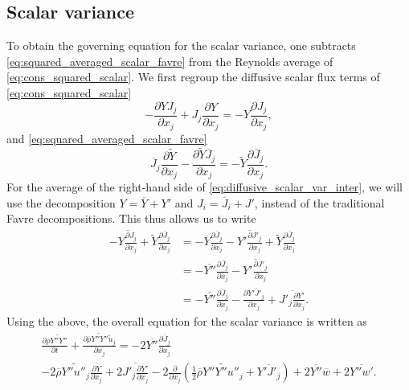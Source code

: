 \documentclass[oneside,a4paper,11pt]{report}
\newcommand{\rhoavg}{\overline{\rho}}
\newcommand{\wavg}{\overline{w}}
\newcommand{\Javg}{\overline{J}}
\newcommand{\Yavg}{\overline{Y}}
\newcommand{\wfluc}{w'}
\newcommand{\Jfluc}{J'}
\newcommand{\Yfluc}{Y'}
\newcommand{\uavgf}{\widetilde{u}}
\newcommand{\Yavgf}{\widetilde{Y}}
\newcommand{\Yflucf}{Y''}
\newcommand{\uflucf}{u''}
\begin{document}
\subsection{Scalar variance}
To obtain the governing equation for the scalar variance, one subtracts \cref{eq:squared_averaged_scalar_favre} from the Reynolds average of \cref{eq:cons_squared_scalar}. We first regroup the diffusive scalar flux terms of \cref{eq:cons_squared_scalar}
\begin{equation}
    \label{eq:diffusive_scalar_var_inter}
    -\frac{\partial Y J_j}{\partial x_j} + J_j \frac{\partial Y}{\partial x_j} = -Y \frac{\partial J_j}{\partial x_j},
\end{equation}
and \cref{eq:squared_averaged_scalar_favre}
\begin{equation}
    \Javg_j \frac{\partial \Yavgf}{\partial x_j} - \frac{\partial \Yavgf \Javg_j}{\partial x_j} = -\Yavgf \frac{\partial \Javg_j}{\partial x_j}.
\end{equation}
For the average of the right-hand side of \cref{eq:diffusive_scalar_var_inter}, we will use the decomposition $Y = \Yavg + \Yfluc$ and $J_i = \Javg_i + \Jfluc$, instead of the traditional Favre decompositions. This thus allows us to write
\begin{align}
    -\overline{ Y \frac{\partial J_j}{\partial x_j} } + \Yavgf \frac{\partial \Javg_j }{\partial x_j} &= -\Yavg \frac{\partial \Javg_j }{\partial x_j} - \overline{ \Yfluc \frac{\partial \Jfluc_j}{\partial x_j} } + \Yavgf \frac{\partial \Javg_j}{\partial x_j} \nonumber \\
    &= -\overline{ \Yflucf } \frac{\partial \Javg_j}{\partial x_j} - \overline{ \Yfluc \frac{\partial \Jfluc_j}{\partial x_j} } \nonumber \\
    &= -\overline{ \Yflucf } \frac{\partial \Javg_j }{\partial x_j} - \frac{\partial \overline{ \Yfluc \Jfluc_j } }{\partial x_j} + \overline{ \Jfluc_j \frac{\partial \Yfluc}{\partial x_j} }.
\end{align}
Using the above, the overall equation for the scalar variance is written as
\begin{multline}
    \label{eq:scalar_variance_favre}
    \frac{\partial \rhoavg \widetilde{\Yflucf \Yflucf}}{\partial t} + \frac{\partial \rhoavg \widetilde{\Yflucf \Yflucf} \uavgf_j }{\partial x_j} = -2 \overline{ \Yflucf } \frac{\partial \Javg_j }{\partial x_j} \\
    -2 \rhoavg \widetilde{\Yflucf \uflucf_j} \frac{\partial \Yavgf}{\partial x_j} + 2 \overline{ \Jfluc_j \frac{\partial \Yfluc}{\partial x_j} } - 2 \frac{\partial}{\partial x_j} \left ( \frac{1}{2} \rhoavg \widetilde{\Yflucf \Yflucf \uflucf_j} +  \overline{ \Yfluc \Jfluc_j } \right) + 2 \overline{ \Yflucf } \wavg + 2 \overline{ \Yflucf \wfluc }.
\end{multline}
\end{document}
